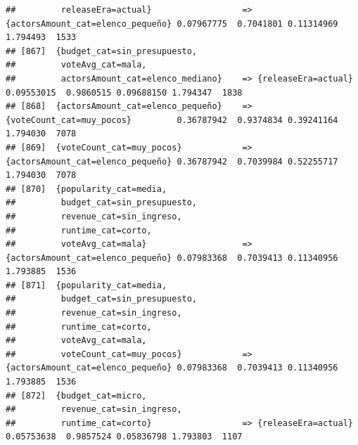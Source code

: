 \documentclass[
]{article}
\begin{document}
\begin{verbatim}
##         releaseEra=actual}                  => {actorsAmount_cat=elenco_pequeño} 0.07967775  0.7041801 0.11314969 1.794493  1533
## [867]  {budget_cat=sin_presupuesto,                                                                                             
##         voteAvg_cat=mala,                                                                                                       
##         actorsAmount_cat=elenco_mediano}    => {releaseEra=actual}               0.09553015  0.9860515 0.09688150 1.794347  1838
## [868]  {actorsAmount_cat=elenco_pequeño}    => {voteCount_cat=muy_pocos}         0.36787942  0.9374834 0.39241164 1.794030  7078
## [869]  {voteCount_cat=muy_pocos}            => {actorsAmount_cat=elenco_pequeño} 0.36787942  0.7039984 0.52255717 1.794030  7078
## [870]  {popularity_cat=media,                                                                                                   
##         budget_cat=sin_presupuesto,                                                                                             
##         revenue_cat=sin_ingreso,                                                                                                
##         runtime_cat=corto,                                                                                                      
##         voteAvg_cat=mala}                   => {actorsAmount_cat=elenco_pequeño} 0.07983368  0.7039413 0.11340956 1.793885  1536
## [871]  {popularity_cat=media,                                                                                                   
##         budget_cat=sin_presupuesto,                                                                                             
##         revenue_cat=sin_ingreso,                                                                                                
##         runtime_cat=corto,                                                                                                      
##         voteAvg_cat=mala,                                                                                                       
##         voteCount_cat=muy_pocos}            => {actorsAmount_cat=elenco_pequeño} 0.07983368  0.7039413 0.11340956 1.793885  1536
## [872]  {budget_cat=micro,                                                                                                       
##         revenue_cat=sin_ingreso,                                                                                                
##         runtime_cat=corto}                  => {releaseEra=actual}               0.05753638  0.9857524 0.05836798 1.793803  1107

\end{verbatim}
\end{document}
